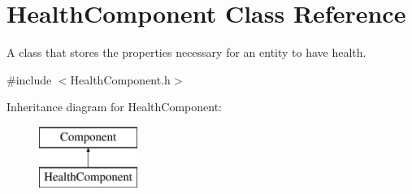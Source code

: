 \hypertarget{class_health_component}{}\section{Health\+Component Class Reference}
\label{class_health_component}


A class that stores the properties necessary for an entity to have health.  




{\ttfamily \#include $<$Health\+Component.\+h$>$}

Inheritance diagram for Health\+Component\+:\begin{figure}[H]
\begin{center}
\leavevmode
\includegraphics[height=2.000000cm]{class_health_component}
\end{center}
\end{figure}
